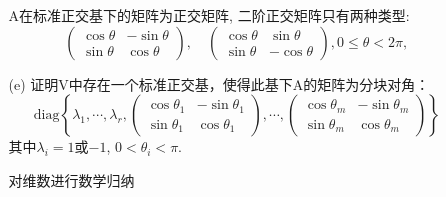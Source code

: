 \begin{itemize}
\begin{itemize}
        \begin{solution}
            A在标准正交基下的矩阵为正交矩阵, 
            二阶正交矩阵只有两种类型:
            \begin{equation}
            \nonumber
            \begin{pmatrix}
                \cos \theta& -\sin \theta\\
                \sin \theta&  \cos \theta 
            \end{pmatrix},\quad
            \begin{pmatrix}
                \cos \theta&  \sin \theta\\
                \sin \theta& -\cos \theta 
            \end{pmatrix},
            0 \le \theta < 2\pi,
            \end{equation}
        \end{solution}
        \item [(e)] 证明V中存在一个标准正交基，使得此基下A的矩阵为分块对角：
        \begin{equation}
        \nonumber
        \mathrm{diag}
        \left\{
            \lambda_1, \cdots, \lambda_r,
            \begin{pmatrix}
            \cos \theta_1& -\sin \theta_1\\
            \sin \theta_1&  \cos \theta_1
            \end{pmatrix},
            \cdots,
            \begin{pmatrix}
            \cos \theta_m& -\sin \theta_m\\
            \sin \theta_m&  \cos \theta_m
            \end{pmatrix}
        \right\}
        \end{equation}
        其中$\lambda_i = 1$或$-1$, $0 < \theta_i < \pi$.
        
        \begin{solution}
            对维数进行数学归纳
        \end{solution}
    \end{itemize}
\end{itemize}